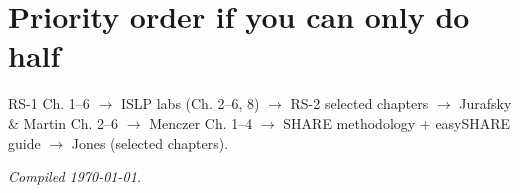 \documentclass[11pt,a4paper]{article}
\begin{document}
\section{Priority order if you can only do half}
RS-1 Ch. 1--6 $\rightarrow$ ISLP labs (Ch. 2--6, 8) $\rightarrow$ RS-2 selected chapters $\rightarrow$ Jurafsky \& Martin Ch. 2--6 $\rightarrow$ Menczer Ch. 1--4 $\rightarrow$ SHARE methodology + easySHARE guide $\rightarrow$ Jones (selected chapters).

\vfill
\begin{center}\small\itshape Compiled \today.\end{center}
\end{document}
